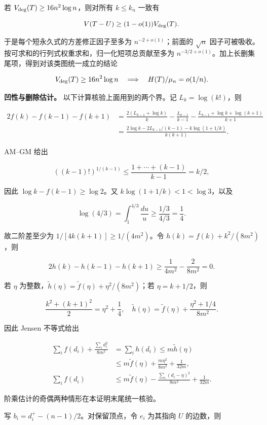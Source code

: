 \documentclass[11pt,a4paper]{article}
\begin{document}
若 \(V_{\rm deg}(T)\ge16n^2\log n\)，则对所有 \(k\le k_n\) 一致有

\[
V(T-U)\ge(1-o(1))V_{\rm deg}(T).
\]

于是每个短永久式的方差修正因子至多为 \(n^{-2+o(1)}\)；前面的 \(\sqrt n\) 因子可被吸收。按可求和的行列式权重求和，归一化短项总贡献至多为 \(n^{-3/2+o(1)}\)。加上长删集尾项，得到对该类图统一成立的结论

\[
V_{\rm deg}(T)\ge16n^2\log n\quad\Longrightarrow\quad
H(T)/\mu_n=o(1/n).
\]

\textbf{凹性与删除估计。} 以下计算核验上面用到的两个界。记 \(L_k=\log(k!)\)，则

\[
\begin{aligned}
2f(k)-f(k-1)-f(k+1)
&=\frac{2(L_{k-1}+\log k)}k-\frac{L_{k-1}}{k-1}
-\frac{L_{k-1}+\log k+\log(k+1)}{k+1}\\
&=\frac{2\log k-2L_{k-1}/(k-1)-k\log(1+1/k)}{k(k+1)}.
\end{aligned}
\]

AM--GM 给出

\[
((k-1)!)^{1/(k-1)}\le\frac{1+\cdots+(k-1)}{k-1}=k/2,
\]

因此 \(\log k-f(k-1)\ge\log2\)。又 \(k\log(1+1/k)<1<\log3\)，以及

\[
\log(4/3)=\int_1^{4/3}\frac{du}{u}\ge\frac{1/3}{4/3}=\frac14.
\]

故二阶差至少为 \(1/[4k(k+1)]\ge1/(4m^2)\)。令 \(h(k)=f(k)+k^2/(8m^2)\)，则

\[
2h(k)-h(k-1)-h(k+1)
\ge\frac1{4m^2}-\frac2{8m^2}=0.
\]

若 \(\eta\) 为整数，\(\widetilde h(\eta)=\widetilde f(\eta)+\eta^2/(8m^2)\)；若 \(\eta=k+1/2\)，则

\[
\frac{k^2+(k+1)^2}{2}=\eta^2+\frac14,
\quad
\widetilde h(\eta)=\widetilde f(\eta)+\frac{\eta^2+1/4}{8m^2}.
\]

因此 Jensen 不等式给出

\[
\begin{aligned}
\sum_i f(d_i)+\frac{\sum_i d_i^2}{8m^2}
&=\sum_i h(d_i)\le m\widetilde h(\eta)\\
&\le m\widetilde f(\eta)+\frac{m\eta^2}{8m^2}+\frac1{32m},\\
\sum_i f(d_i)&\le m\widetilde f(\eta)
-\frac{\sum_i(d_i-\eta)^2}{8m^2}+\frac1{32m}.
\end{aligned}
\]

阶乘估计的奇偶两种情形在本证明末尾统一核验。

写 \(b_i=d_i^+-(n-1)/2\)。对保留顶点，令 \(e_i\) 为其指向 \(U\) 的边数，则
\end{document}
